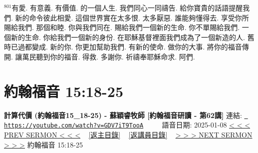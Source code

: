 \documentclass{book}
\begin{document}
$^{801}$有愛.
有意義.
有價值.
的一個人生.
我們同心一同禱告.
給你寶貴的話語提醒我們.
新的命令彼此相愛.
這個世界實在太多恨.
太多厭惡.
誰能夠懂得去.
享受你所賜給我們.
那個和睦.
你與我們同在.
賜給我們一個新的生命.
你不單賜給我們.
一個新的生命.
你給我們一個新的身份.
在耶穌基督裡面我們成為了一個新造的人.
舊時已過都變成.
新的你.
你更加幫助我們.
有新的使命.
做你的大事.
將你的福音傳開.
讓萬民聽到你的福音.
得救.
多謝你.
祈禱奉耶穌命求.
阿們.
\newpage



\section{約翰福音 15:18-25}
\label{sec:GDV7iT9TooA}
\textbf{計算代價 (約翰福音15\_18-25) - 蘇穎睿牧師 [約翰福音研讀 - 第62講]}
\newline
\newline
連結: \href{https://youtube.com/watch?v=GDV7iT9TooA}{\texttt{ https://youtube.com/watch?v=GDV7iT9TooA}} ~~~~ 語音日期: 2025-01-08 
\newline
\newline
\hyperref[sec:prT7wwZLltI]{< < < PREV SERMON < < <}
~
\hyperlink{toc}{[返主目錄]}
~
\hyperref[ch:preacher5]{[返講員目錄]}
~
\hyperref[sec:pF1FrHKEPww]{> > > NEXT SERMON > > >}
\newline
\newline
約翰福音 15:18-25
\newline
\end{document}
